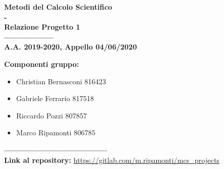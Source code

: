 \begin{center}
    {\Huge \textbf{Metodi del Calcolo Scientifico}}\\
    {\Huge \textbf{-}}\\
    {\Huge \textbf{Relazione Progetto 1}}\\
    {\Huge \textbf{------------------}}\\
    {\textbf{A.A. 2019-2020, Appello 04/06/2020}}\\
\end{center}

\vspace{4cm}

\large\textbf{Componenti gruppo:}\\
\begin{itemize}
    \item Christian Bernasconi 816423\\
    \item Gabriele Ferrario 817518\\
    \item Riccardo Pozzi 807857\\
    \item Marco Ripamonti 806785    
\end{itemize}

{\Huge \textbf{--------------------------------------}}\\
\small\textbf{Link al repository:} \url{https://gitlab.com/m.ripamonti/mcs_projects}